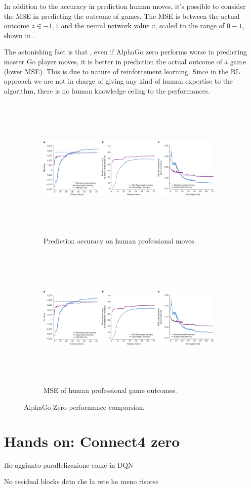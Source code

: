 \documentclass{article}
\begin{document}
In addition to the accuracy in prediction human moves, it's possible to consider the MSE in predicting the outcome of games. The MSE is between the actual outcome $z \in {-1, 1}$ and the neural network value $v$, scaled to the range of $0-1$, shown in .

The astonishing fact is that , even if AlphaGo zero performs worse in predicting master Go player moves, it is better in prediction the actual outcome of a game (lower MSE). This is due to nature of reinforcement learning. Since in the RL approach we are not in charge of giving any kind of human expertise to the algorithm, there is no human knowledge celing to the performances.

\begin{figure}[H]
	\begin{subfigure}{.5\textwidth}
		\centering
		\includegraphics[height=7cm,trim={717px 0px 710px 45px},clip]{alpha-go-zero_empirical_results.png}
		\caption{Prediction accuracy on human professional moves.}
		\label{fig:training-acc}
	\end{subfigure}
	\hfill
	\begin{subfigure}{.5\textwidth}
		\centering
		\includegraphics[height=7cm,trim={1408px 0px 0px 45px},clip]{alpha-go-zero_empirical_results.png}
		\caption{MSE of human professional game outcomes.}
		\label{fig:training-mse}
	\end{subfigure}
	\caption{AlphaGo Zero performance comparsion. \cite{Silver_2016}}
\end{figure}


\section{Hands on: Connect4 zero}
Ho aggiunto parallelizazione come in DQN

No residual blocks dato che la rete ho meno risorse


\end{document}
